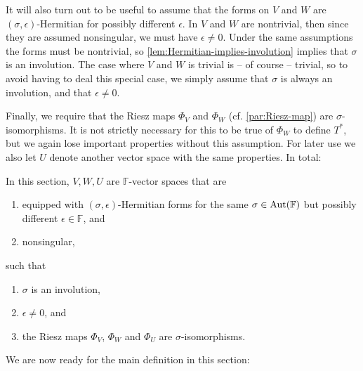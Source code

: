 \documentclass[a4paper, 11pt]{memoir}
\theoremstyle{plaincustomnumber}
\theoremstyle{changedotbreakcustomnumber}
\newcommand{\field}{\mathbb{F}}
\begin{document}
It will also turn out to be useful to assume that the forms on $V$ and $W$ are $(\sigma,\epsilon)$-Hermitian for possibly different $\epsilon$. In $V$ and $W$ are nontrivial, then since they are assumed nonsingular, we must have $\epsilon \neq 0$. Under the same assumptions the forms must be nontrivial, so \cref{lem:Hermitian-implies-involution} implies that $\sigma$ is an involution. The case where $V$ and $W$ is trivial is -- of course -- trivial, so to avoid having to deal this special case, we simply assume that $\sigma$ is always an involution, and that $\epsilon \neq 0$.

Finally, we require that the Riesz maps $\Phi_V$ and $\Phi_W$ (cf. \cref{par:Riesz-map}) are $\sigma$-isomorphisms. It is not strictly necessary for this to be true of $\Phi_W$ to define $T^*$, but we again lose important properties without this assumption. For later use we also let $U$ denote another vector space with the same properties. In total:

\begin{assumption}
    In this section, $V,W,U$ are $\field$-vector spaces that are
    \begin{enumerate}
        \item equipped with $(\sigma,\epsilon)$-Hermitian forms for the same $\sigma \in \Aut(\field)$ but possibly different $\epsilon \in \field$, and
        \item nonsingular,
    \end{enumerate}
    such that
    \begin{enumerate}[resume]
        \item $\sigma$ is an involution,
        \item $\epsilon \neq 0$, and
        \item the Riesz maps $\Phi_V$, $\Phi_W$ and $\Phi_U$ are $\sigma$-isomorphisms.
    \end{enumerate}
\end{assumption}


\newpar

We are now ready for the main definition in this section:
\end{document}
